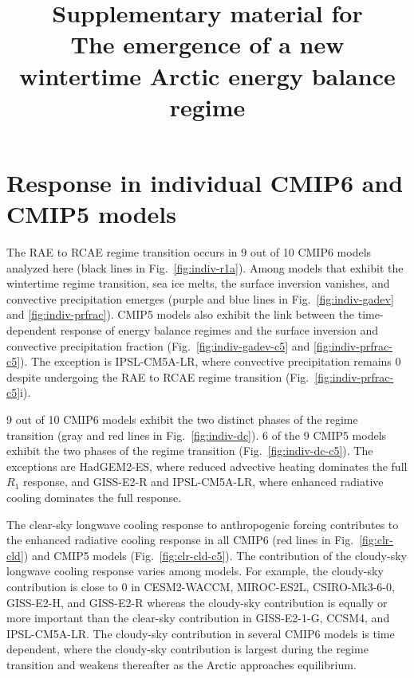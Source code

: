 \documentclass[draft]{agujournal2019}
\begin{document}
\title{Supplementary material for\\The emergence of a new wintertime Arctic energy balance regime}






\renewcommand{\thefigure}{S\arabic{figure}}
\renewcommand{\thetable}{S\arabic{table}}

\newpage

\section{Response in individual CMIP6 and CMIP5 models}
\label{sec:c4aa}
The RAE to RCAE regime transition occurs in 9 out of 10 CMIP6 models analyzed here (black lines in Fig.~\ref{fig:indiv-r1a}). Among models that exhibit the wintertime regime transition, sea ice melts, the surface inversion vanishes, and convective precipitation emerges (purple and blue lines in Fig.~\ref{fig:indiv-gadev} and \ref{fig:indiv-prfrac}). CMIP5 models also exhibit the link between the time-dependent response of energy balance regimes and the surface inversion and convective precipitation fraction (Fig.~\ref{fig:indiv-gadev-c5} and \ref{fig:indiv-prfrac-c5}). The exception is IPSL-CM5A-LR, where convective precipitation remains 0 despite undergoing the RAE to RCAE regime transition (Fig.~\ref{fig:indiv-prfrac-c5}i).

9 out of 10 CMIP6 models exhibit the two distinct phases of the regime transition (gray and red lines in Fig.~\ref{fig:indiv-dc}). 6 of the 9 CMIP5 models exhibit the two phases of the regime transition (Fig.~\ref{fig:indiv-dc-c5}). The exceptions are HadGEM2-ES, where reduced advective heating dominates the full $R_1$ response, and GISS-E2-R and IPSL-CM5A-LR, where enhanced radiative cooling dominates the full response.

The clear-sky longwave cooling response to anthropogenic forcing contributes to the enhanced radiative cooling response in all CMIP6 (red lines in Fig.~\ref{fig:clr-cld}) and CMIP5 models (Fig.~\ref{fig:clr-cld-c5}). The contribution of the cloudy-sky longwave cooling response varies among models. For example, the cloudy-sky contribution is close to 0 in CESM2-WACCM, MIROC-ES2L, CSIRO-Mk3-6-0, GISS-E2-H, and GISS-E2-R whereas the cloudy-sky contribution is equally or more important than the clear-sky contribution in GISS-E2-1-G, CCSM4, and IPSL-CM5A-LR. The cloudy-sky contribution in several CMIP6 models is time dependent, where the cloudy-sky contribution is largest during the regime transition and weakens thereafter as the Arctic approaches equilibrium.
\end{document}
